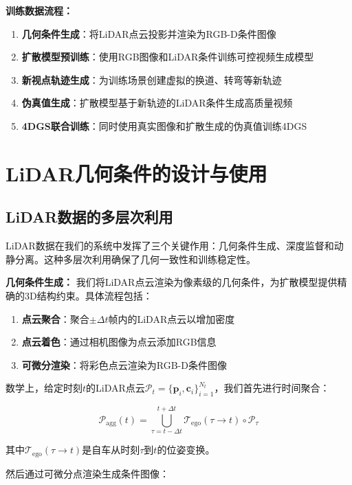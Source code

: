 \textbf{训练数据流程：}
\begin{enumerate}
\item \textbf{几何条件生成}：将LiDAR点云投影并渲染为RGB-D条件图像
\item \textbf{扩散模型预训练}：使用RGB图像和LiDAR条件训练可控视频生成模型
\item \textbf{新视点轨迹生成}：为训练场景创建虚拟的换道、转弯等新轨迹
\item \textbf{伪真值生成}：扩散模型基于新轨迹的LiDAR条件生成高质量视频
\item \textbf{4DGS联合训练}：同时使用真实图像和扩散生成的伪真值训练4DGS
\end{enumerate}

\section{LiDAR几何条件的设计与使用}

\subsection{LiDAR数据的多层次利用}

LiDAR数据在我们的系统中发挥了三个关键作用：几何条件生成、深度监督和动静分离。这种多层次利用确保了几何一致性和训练稳定性。

\textbf{几何条件生成：}
我们将LiDAR点云渲染为像素级的几何条件，为扩散模型提供精确的3D结构约束。具体流程包括：

\begin{enumerate}
\item \textbf{点云聚合}：聚合$\pm\Delta t$帧内的LiDAR点云以增加密度
\item \textbf{点云着色}：通过相机图像为点云添加RGB信息
\item \textbf{可微分渲染}：将彩色点云渲染为RGB-D条件图像
\end{enumerate}

数学上，给定时刻$t$的LiDAR点云$\mathcal{P}_t = \{\mathbf{p}_i, \mathbf{c}_i\}_{i=1}^{N_t}$，我们首先进行时间聚合：

\begin{equation}
\mathcal{P}_{\text{agg}}(t) = \bigcup_{\tau=t-\Delta t}^{t+\Delta t} \mathcal{T}_{\text{ego}}(\tau \rightarrow t) \circ \mathcal{P}_\tau
\label{eq:lidar_aggregation}
\end{equation}

其中$\mathcal{T}_{\text{ego}}(\tau \rightarrow t)$是自车从时刻$\tau$到$t$的位姿变换。

然后通过可微分点渲染生成条件图像：

